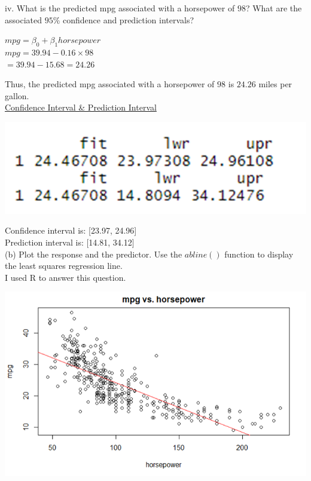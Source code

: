 \documentclass{article}
\begin{document}
\indent iv. What is the predicted mpg associated with a horsepower of
$98$? What are the associated $95\%$ confidence and prediction intervals?
\begin{center}
    $mpg = \beta_0 + \beta_1 horsepower$ \\
    $mpg = 39.94 - 0.16 \times 98$ \\
    \;\;\;\;\;\;\;\;\;\;\;\;\;\; $= 39.94 - 15.68 = 24.26$
\end{center}
Thus, the predicted mpg associated with a horsepower of $98$ is $24.26$ miles per gallon. \\
\linebreak \underline{Confidence Interval \& Prediction Interval} 
\begin{center}
\includegraphics[scale = 0.46]{3.8.a.iv.png} \\
\end{center}
Confidence interval is: [23.97, 24.96] \\
Prediction interval is: [14.81, 34.12] \\
\linebreak (b) Plot the response and the predictor. Use the $abline()$ function
to display the least squares regression line. \\
\indent I used R to answer this question.
\begin{center}
\includegraphics[scale = 0.46]{3.8.b.png} \\
\end{center}
\end{document}

